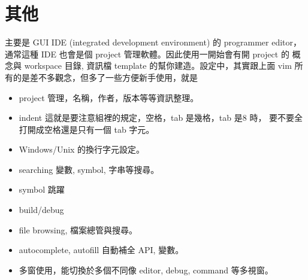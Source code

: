   \section{其他}
  主要是 GUI IDE (integrated development environment) 的 programmer editor，
  通常這種 IDE 也會是個 project 管理軟體。因此使用一開始會有開 project 的
  概念與 workspace 目錄, 資訊檔 template 的幫你建造。設定中，其實跟上面 vim
  所有的是差不多觀念，但多了一些方便新手使用，就是
  \begin{itemize}
    \item project 管理，名稱，作者，版本等等資訊整理。
    \item indent 這就是要注意組裡的規定，空格，tab 是幾格，tab 是8 時，
      要不要全打開成空格還是只有一個 tab 字元。
    \item Windows/Unix 的換行字元設定。
    \item searching 變數, symbol, 字串等搜尋。
    \item symbol 跳躍
    \item build/debug
    \item file browsing, 檔案總管與搜尋。
    \item autocomplete, autofill 自動補全 API, 變數。
    \item 多窗使用，能切換於多個不同像 editor, debug, command 等多視窗。
  \end{itemize}
